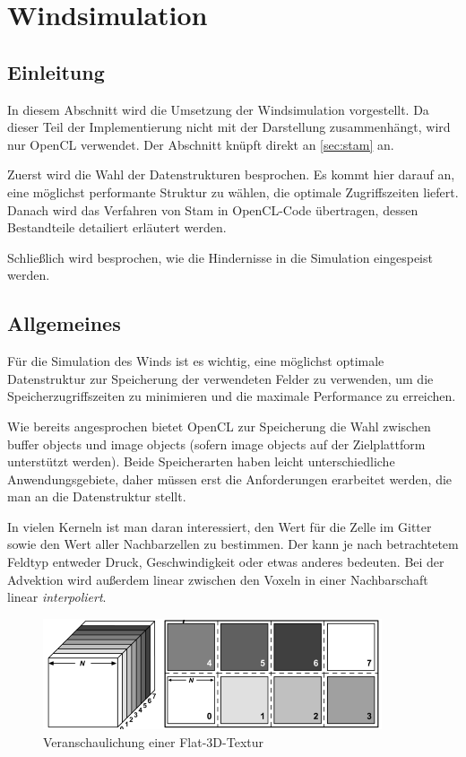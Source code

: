 \section{Windsimulation}

\subsection{Einleitung}

In diesem Abschnitt wird die Umsetzung der Windsimulation
vorgestellt. Da dieser Teil der Implementierung nicht mit der
Darstellung zusammenhängt, wird nur OpenCL verwendet. Der Abschnitt
knüpft direkt an \autoref{sec:stam} an.

Zuerst wird die Wahl der Datenstrukturen besprochen. Es kommt hier
darauf an, eine möglichst performante Struktur zu wählen, die optimale
Zugriffszeiten liefert. Danach wird das Verfahren von Stam in
OpenCL-Code übertragen, dessen Bestandteile detailiert erläutert
werden.

Schließlich wird besprochen, wie die Hindernisse in die
Simulation eingespeist werden.

\subsection{Allgemeines}

Für die Simulation des Winds ist es wichtig, eine möglichst optimale
Datenstruktur zur Speicherung der verwendeten Felder zu verwenden, um
die Speicherzugriffszeiten zu minimieren und die maximale Performance zu
erreichen.

Wie bereits angesprochen bietet OpenCL zur Speicherung die Wahl
zwischen buffer objects und image objects (sofern image objects auf der
Zielplattform unterstützt werden). Beide Speicherarten haben leicht
unterschiedliche Anwendungsgebiete, daher müssen erst die
Anforderungen erarbeitet werden, die man an die Datenstruktur
stellt.

In vielen Kerneln ist man daran interessiert, den Wert für die
 Zelle im Gitter sowie den Wert aller
Nachbarzellen zu bestimmen. Der  kann je nach
betrachtetem Feldtyp entweder Druck, Geschwindigkeit oder etwas
anderes bedeuten. Bei der Advektion wird außerdem linear zwischen den
Voxeln in einer Nachbarschaft linear \emph{interpoliert}.

\begin{figure}[h]
\centering
\includegraphics[width=10cm]{images/flat_3d_texture}
\caption{Veranschaulichung einer Flat-3D-Textur}
\label{fig:implementation_flat_3d_texture}
\end{figure}

